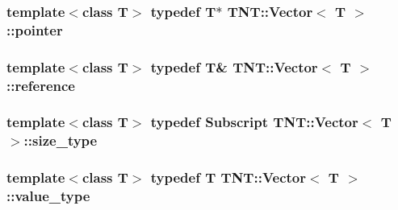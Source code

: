 \hypertarget{classTNT_1_1Vector_aacdf3935ca58837be7e80d21d8e17c6d}{
\subsubsection[{pointer}]{\setlength{\rightskip}{0pt plus 5cm}template$<$class T$>$ typedef T$\ast$ {\bf T\-N\-T\-::\-Vector}$<$ T $>$\-::{\bf pointer}}}\label{classTNT_1_1Vector_aacdf3935ca58837be7e80d21d8e17c6d}
\hypertarget{classTNT_1_1Vector_a9cdf62749080406bdf3fbace264dac85}{
\subsubsection[{reference}]{\setlength{\rightskip}{0pt plus 5cm}template$<$class T$>$ typedef T\& {\bf T\-N\-T\-::\-Vector}$<$ T $>$\-::{\bf reference}}}\label{classTNT_1_1Vector_a9cdf62749080406bdf3fbace264dac85}
\hypertarget{classTNT_1_1Vector_adf52e96536358fcc4507fd08402aa07f}{
\subsubsection[{size\-\_\-type}]{\setlength{\rightskip}{0pt plus 5cm}template$<$class T$>$ typedef {\bf Subscript} {\bf T\-N\-T\-::\-Vector}$<$ T $>$\-::{\bf size\-\_\-type}}}\label{classTNT_1_1Vector_adf52e96536358fcc4507fd08402aa07f}
\hypertarget{classTNT_1_1Vector_a329d23fe25894a94d461353dd9c7c1be}{
\subsubsection[{value\-\_\-type}]{\setlength{\rightskip}{0pt plus 5cm}template$<$class T$>$ typedef T {\bf T\-N\-T\-::\-Vector}$<$ T $>$\-::{\bf value\-\_\-type}}}\label{classTNT_1_1Vector_a329d23fe25894a94d461353dd9c7c1be}


